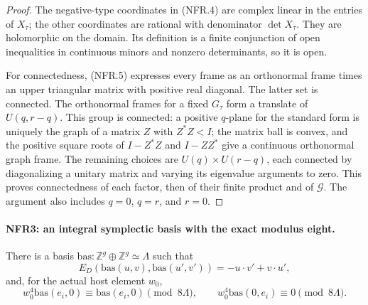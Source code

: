 \documentclass[11pt,a4paper]{article}
\numberwithin{equation}{section}
\theoremstyle{remark}\newtheorem{remark}[theorem]{Remark}
\begin{document}
\begin{proof}
The negative-type coordinates in (NFR.4) are complex linear in
the entries of $X_\tau$; the other coordinates are rational with
denominator $\det X_\tau$.  They are holomorphic on the domain.
Its definition is a finite conjunction of open inequalities in
continuous minors and nonzero determinants, so it is open.

For connectedness, (NFR.5) expresses every frame as an
orthonormal frame times an upper triangular matrix with positive
real diagonal.  The latter set is connected.  The orthonormal
frames for a fixed $G_\tau$ form a translate of $U(q,r-q)$.
This group is connected: a positive $q$-plane for the standard
form is uniquely the graph of a matrix $Z$ with $Z^*Z<I$;
the matrix ball is convex, and the positive square roots of
$I-Z^*Z$ and $I-ZZ^*$ give a continuous orthonormal graph frame.
The remaining choices are $U(q)\times U(r-q)$, each connected
by diagonalizing a unitary matrix and varying its eigenvalue
arguments to zero.  This proves connectedness of each factor,
then of their finite product and of $\mathcal G$.
The argument also includes $q=0$, $q=r$, and $r=0$.
\end{proof}

\paragraph{NFR3: an integral symplectic basis with the exact modulus eight.}
\label{claim:NFR3}
There is a basis
$\mathrm{bas}:\mathbb Z^g\oplus\mathbb Z^g\simeq\Lambda$ such that
\[
 E_D(\mathrm{bas}(u,v),\mathrm{bas}(u',v'))
                      =-u\cdot v'+v\cdot u',
 \tag{NFR.8}
\]
and, for the actual host element $w_0$,
\[
 w_0^4\mathrm{bas}(e_i,0)\equiv\mathrm{bas}(e_i,0)\pmod{8\Lambda},
 \qquad w_0^4\mathrm{bas}(0,e_i)\equiv0\pmod{8\Lambda}.
 \tag{NFR.9}
\]
\end{document}
